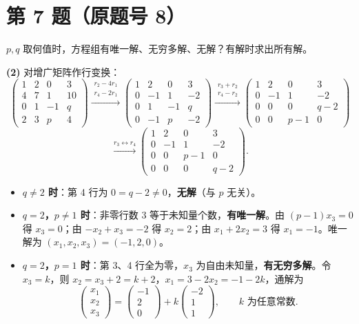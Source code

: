 \documentclass[11pt,a4paper]{ctexart}
\newcommand{\rt}[1]{\xrightarrow{#1}}
\newenvironment{problem}[1]
  {\par\medskip\noindent\textbf{#1}\quad}
  {\par}
\begin{document}
\section*{第 7 题（原题号 8）}

\begin{problem}{}$p,q$ 取何值时，方程组有唯一解、无穷多解、无解？有解时求出所有解。\end{problem}

\textbf{(2)} 对增广矩阵作行变换：
\[
\left(\begin{array}{ccc|c}1&2&0&3\\4&7&1&10\\0&1&-1&q\\2&3&p&4\end{array}\right)
\rt{\substack{r_2-4r_1\\ r_4-2r_1}}
\left(\begin{array}{ccc|c}1&2&0&3\\0&-1&1&-2\\0&1&-1&q\\0&-1&p&-2\end{array}\right)
\rt{\substack{r_3+r_2\\ r_4-r_2}}
\left(\begin{array}{ccc|c}1&2&0&3\\0&-1&1&-2\\0&0&0&q-2\\0&0&p-1&0\end{array}\right)
\]
\[
\rt{r_3\leftrightarrow r_4}
\left(\begin{array}{ccc|c}1&2&0&3\\0&-1&1&-2\\0&0&p-1&0\\0&0&0&q-2\end{array}\right).
\]
\begin{itemize}
  \item \textbf{$q\ne2$ 时}：第 4 行为 $0=q-2\ne0$，\textbf{无解}（与 $p$ 无关）。
  \item \textbf{$q=2$，$p\ne1$ 时}：非零行数 $3$ 等于未知量个数，\textbf{有唯一解}。由 $(p-1)x_3=0$ 得 $x_3=0$；由 $-x_2+x_3=-2$ 得 $x_2=2$；由 $x_1+2x_2=3$ 得 $x_1=-1$。唯一解为 $(x_1,x_2,x_3)=(-1,2,0)$。
  \item \textbf{$q=2$，$p=1$ 时}：第 3、4 行全为零，$x_3$ 为自由未知量，\textbf{有无穷多解}。令 $x_3=k$，则 $x_2=x_3+2=k+2$，$x_1=3-2x_2=-1-2k$，通解为
  \[
  \begin{pmatrix}x_1\\x_2\\x_3\end{pmatrix}
  =\begin{pmatrix}-1\\2\\0\end{pmatrix}+k\begin{pmatrix}-2\\1\\1\end{pmatrix},\qquad k\text{ 为任意常数}.
  \]
\end{itemize}
\end{document}
